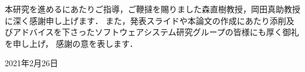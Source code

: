 \newpage
\changeindent{0cm}
\acknowledgements
\changeindent{2cm}

本研究を進めるにあたりご指導，ご鞭撻を賜りました森直樹教授，岡田真助教授に深く感謝申し上げます．
また，発表スライドや本論文の作成にあたり添削及びアドバイスを下さったソフトウェアシステム研究グループの皆様にも厚く御礼を申し上げ，
感謝の意を表します．
\begin{flushright}
	2021年2月26日
\end{flushright}
